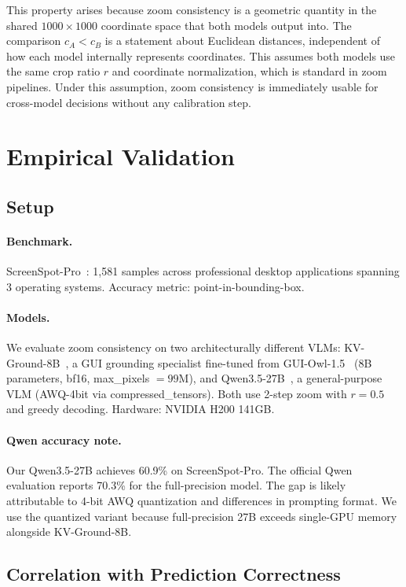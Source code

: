 \documentclass{article}
\begin{document}
This property arises because zoom consistency is a geometric quantity in the shared $1000\times1000$ coordinate space that both models output into. The comparison $c_A < c_B$ is a statement about Euclidean distances, independent of how each model internally represents coordinates. This assumes both models use the same crop ratio $r$ and coordinate normalization, which is standard in zoom pipelines. Under this assumption, zoom consistency is immediately usable for cross-model decisions without any calibration step.

\section{Empirical Validation}

\subsection{Setup}

\paragraph{Benchmark.}
ScreenSpot-Pro~\cite{li2025screenspotpro,screenspotpro_repo}: 1,581 samples across professional desktop applications spanning 3 operating systems. Accuracy metric: point-in-bounding-box.

\paragraph{Models.}
We evaluate zoom consistency on two architecturally different VLMs: KV-Ground-8B~\cite{kvground}, a GUI grounding specialist fine-tuned from GUI-Owl-1.5~\cite{guiowl} (8B parameters, bf16, max\_pixels $= 99$M), and Qwen3.5-27B~\cite{qwen35}, a general-purpose VLM (AWQ-4bit via compressed\_tensors). Both use 2-step zoom with $r = 0.5$ and greedy decoding. Hardware: NVIDIA H200 141GB.

\paragraph{Qwen accuracy note.} Our Qwen3.5-27B achieves 60.9\% on ScreenSpot-Pro. The official Qwen evaluation reports 70.3\% for the full-precision model. The gap is likely attributable to 4-bit AWQ quantization and differences in prompting format. We use the quantized variant because full-precision 27B exceeds single-GPU memory alongside KV-Ground-8B.

\subsection{Correlation with Prediction Correctness}
\end{document}
